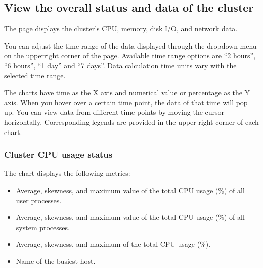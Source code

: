 \documentclass[letterpaper,10pt,english]{sphinxmanual}
\begin{document}
\subsection{View the overall status and data of the cluster}
\label{\detokenize{manage-system/web-platform-monitoring/web-platform-view-cluster-status:view-the-overall-status-and-data-of-the-cluster}}
\noindent{}

\sphinxAtStartPar
The  page displays the cluster’s CPU, memory, disk I/O, and network data.

\sphinxAtStartPar
You can adjust the time range of the data displayed through the drop\sphinxhyphen{}down menu on the upper\sphinxhyphen{}right corner of the page. Available time range options are “2 hours”, “6 hours”, “1 day” and “7 days”. Data calculation time units vary with the selected time range.

\sphinxAtStartPar
The charts have time as the X axis and numerical value or percentage as the Y axis. When you hover over a certain time point, the data of that time will pop up. You can view data from different time points by moving the cursor horizontally. Corresponding legends are provided in the upper right corner of each chart.


\subsubsection{Cluster CPU usage status}
\label{\detokenize{manage-system/web-platform-monitoring/web-platform-view-cluster-status:cluster-cpu-usage-status}}
\sphinxAtStartPar
The chart displays the following metrics:
\begin{itemize}
\item {} 
\sphinxAtStartPar
Average, skewness, and maximum value of the total CPU usage (\%) of all user processes.

\item {} 
\sphinxAtStartPar
Average, skewness, and maximum value of the total CPU usage (\%) of all system processes.

\item {} 
\sphinxAtStartPar
Average, skewness, and maximum of the total CPU usage (\%).

\item {} 
\sphinxAtStartPar
Name of the busiest host.

\end{itemize}
\end{document}

